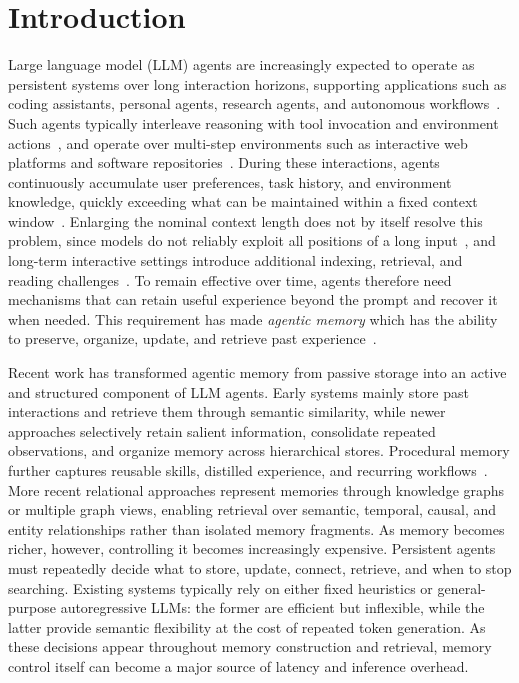 \documentclass[11pt]{article}
\begin{document}
\section{Introduction}
Large language model (LLM) agents are increasingly expected to operate as persistent systems over long interaction horizons, supporting applications such as coding assistants, personal agents, research agents, and autonomous workflows~\citep{Brown2020, achiam2023gpt, Wei2022}. Such agents typically interleave reasoning with tool invocation and environment actions~\citep{yao2023react, schick2023toolformer}, and operate over multi-step environments such as interactive web platforms and software repositories~\citep{zhou2024webarena, yang2024sweagent}. During these interactions, agents continuously accumulate user preferences, task history, and environment knowledge, quickly exceeding what can be maintained within a fixed context window~\citep{Beltagy2020, liu2024lost, Press2021}. Enlarging the nominal context length does not by itself resolve this problem, since models do not reliably exploit all positions of a long input~\citep{hsieh2024ruler}, and long-term interactive settings introduce additional indexing, retrieval, and reading challenges~\citep{lee2024human, wu2024longmemeval, hu2025memoryagentbench}. To remain effective over time, agents therefore need mechanisms that can retain useful experience beyond the prompt and recover it when needed. This requirement has made \emph{agentic memory} which has the ability to preserve, organize, update, and retrieve past experience~\citep{xu2025mem, nan2025nemori, chhikara2025mem0, jiang2026magma, liu2026simplemem, jiang2026anatomy}.

Recent work has transformed agentic memory from passive storage into an active and structured component of LLM agents. Early systems mainly store past interactions and retrieve them through semantic similarity, while newer approaches selectively retain salient information, consolidate repeated observations, and organize memory across hierarchical stores. Procedural memory further captures reusable skills, distilled experience, and recurring workflows~\citep{wang2023voyager, zhao2024expel, wang2024awm}. More recent relational approaches represent memories through knowledge graphs or multiple graph views, enabling retrieval over semantic, temporal, causal, and entity relationships rather than isolated memory fragments.
As memory becomes richer, however, controlling it becomes increasingly expensive. Persistent agents must repeatedly decide what to store, update, connect, retrieve, and when to stop searching. Existing systems typically rely on either fixed heuristics or general-purpose autoregressive LLMs: the former are efficient but inflexible, while the latter provide semantic flexibility at the cost of repeated token generation. As these decisions appear throughout memory construction and retrieval, memory control itself can become a major source of latency and inference overhead.
\end{document}
